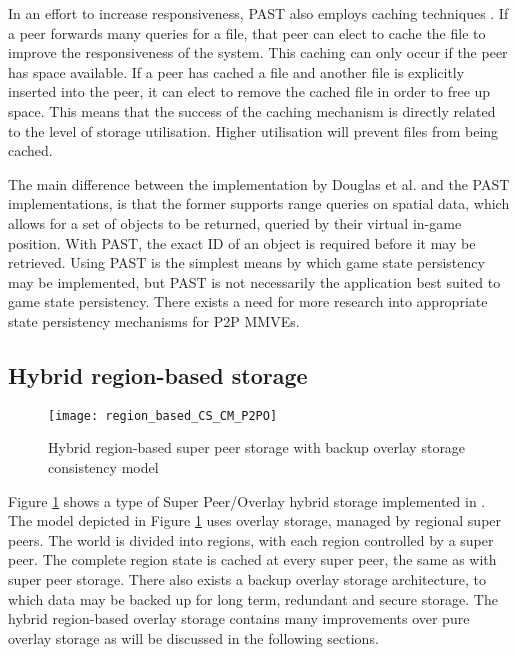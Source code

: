 In an effort to increase responsiveness, PAST also employs caching techniques \cite{storage_and_chaching_PAST}. If a peer forwards many queries for a file, that peer can elect to cache the file to improve the responsiveness of the system. This caching can only occur if the peer has space available. If a peer has cached a file and another file is explicitly inserted into the peer, it can elect to remove the cached file in order to free up space. This means that the success of the caching mechanism is directly related to the level of storage utilisation. Higher utilisation will prevent files
from being cached.

The main difference between the implementation by Douglas et al. and the PAST implementations, is that the former supports range queries on spatial data, which allows for a set of objects to be returned, queried by their virtual in-game position. With PAST, the exact ID of an object is required before it may be retrieved. Using PAST is the simplest means by which game state persistency may be implemented, but PAST is not necessarily the application best suited to game state persistency. There exists a need for more research into appropriate state persistency mechanisms for P2P MMVEs.

\subsection{Hybrid region-based storage}
\label{hybrid_storage}

\begin{figure}[htbp]
 \centering
 \texttt{[image: region\_based\_CS\_CM\_P2PO]}
 \caption{Hybrid region-based super peer storage with backup overlay storage consistency model}
 \label{fig_cs_region_o_cm}
\end{figure}
%
Figure \ref{fig_cs_region_o_cm} shows a type of Super Peer/Overlay hybrid storage implemented in  \cite{zoned_federation}. The model depicted in Figure \ref{fig_cs_region_o_cm} uses overlay storage, managed by regional super peers. The world is divided into regions, with each region controlled by a super peer. The complete region state is cached at every super peer, the same as with super peer storage. There also exists a backup
overlay storage architecture, to which data may be backed up for long term, redundant and secure storage. The hybrid region-based overlay storage contains many improvements over pure overlay storage as will be discussed in the following sections.

